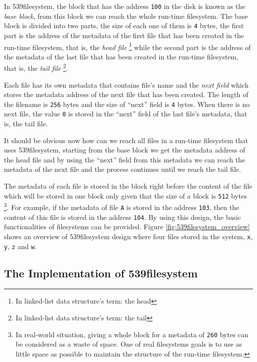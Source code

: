In 539filesystem, the block that has the address \lstinline!100! in the
disk is known as the \emph{base block}, from this block we can reach the
whole run-time filesystem. The base block is divided into two parts, the
size of each one of them is \lstinline!4! bytes, the first part is the
address of the metadata of the first file that has been created in the
run-time filesystem, that is, the \emph{head file} \footnote{In
  linked-list data structure's term: the head} while the second part is
the address of the metadata of the last file that has been created in
the run-time filesystem, that is, the \emph{tail file} \footnote{In
  linked-list data structure's term: the tail}.

Each file has its own metadata that contains file's name and the
\emph{next field} which stores the metadata address of the next file
that has been created. The length of the filename is \lstinline!256!
bytes and the size of ``next'' field is \lstinline!4! bytes. When there
is no next file, the value \lstinline!0! is stored in the ``next'' field
of the last file's metadata, that is, the tail file.

It should be obvious now how can we reach all files in a run-time
filesystem that uses 539filesystem, starting from the base block we get
the metadata address of the head file and by using the ``next'' field
from this metadata we can reach the metadata of the next file and the
process continues until we reach the tail file.

The metadata of each file is stored in the block right before the
content of the file which will be stored in one block only given that
the size of a block is \lstinline!512! bytes \footnote{In real-world
  situation, giving a whole block for a metadata of \lstinline!260!
  bytes can be considered as a waste of space. One of real filesystems
  goals is to use as little space as possible to maintain the structure
  of the run-time filesystem.}. For example, if the metadata of file
\lstinline!A! is stored in the address \lstinline!103!, then the content
of this file is stored in the address \lstinline!104!. By using this
design, the basic functionalities of filesystems can be provided. Figure
\ref{fig:539filesystem_overview} shows an overview of 539filesystem
design where four files stored in the system, \lstinline!x!,
\lstinline!y!, \lstinline!z! and \lstinline!w!.

\subsection{The Implementation of
539filesystem}\label{the-implementation-of-539filesystem}

